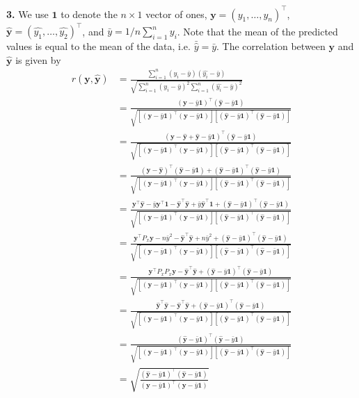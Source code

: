 \documentclass[12pt]{article}
\newcommand{\m}[1]{\mathbf{\bm{#1}}}
\begin{document}
\noindent \textbf{3.} We use $\m{1}$ to denote the $n\times 1$ vector of ones, $\m{y}=(y_1,\ldots,y_n)^\top$, $\hat{\m{y}}=(\hat{y_1},\ldots,\hat{y_2})^\top$, and $\bar{y}=1/n\sum_{i=1}^n y_i$. Note that the mean of the predicted values is equal to the mean of the data, i.e. $\bar{\hat{y}}=\bar{y}$. The correlation between $\m{y}$ and $\hat{\m{y}}$ is given by
\begin{align*}
r(\m{y}, \hat{\m{y}}) &= \frac{\sum_{i=1}^n(y_i-\bar{y})(\hat{y_i}-\bar{y})}{\sqrt{\sum_{i=1}^n(y_i-\bar{y})^2\sum_{i=1}^n(\hat{y_i}-\bar{y})^2}} \\
&= \frac{(\m{y}-\bar{y}\m{1})^\top(\hat{\m{y}}-\bar{y}\m{1})}{\sqrt{\left[(\m{y}-\bar{y}\m{1})^\top(\m{y}-\bar{y}\m{1})\right]\left[(\hat{\m{y}}-\bar{y}\m{1})^\top(\hat{\m{y}}-\bar{y}\m{1})\right]}} \\
&= \frac{(\m{y}-\hat{\m{y}}+\hat{\m{y}}-\bar{y}\m{1})^\top(\hat{\m{y}}-\bar{y}\m{1})}{\sqrt{\left[(\m{y}-\bar{y}\m{1})^\top(\m{y}-\bar{y}\m{1})\right]\left[(\hat{\m{y}}-\bar{y}\m{1})^\top(\hat{\m{y}}-\bar{y}\m{1})\right]}} \\
&= \frac{(\m{y}-\hat{\m{y}})^\top(\hat{\m{y}}-\bar{y}\m{1})+(\hat{\m{y}}-\bar{y}\m{1})^\top(\hat{\m{y}}-\bar{y}\m{1})}{\sqrt{\left[(\m{y}-\bar{y}\m{1})^\top(\m{y}-\bar{y}\m{1})\right]\left[(\hat{\m{y}}-\bar{y}\m{1})^\top(\hat{\m{y}}-\bar{y}\m{1})\right]}} \\
&= \frac{\m{y}^\top\hat{\m{y}}-\bar{y}\m{y}^\top\m{1}-\hat{\m{y}}^\top\hat{\m{y}}+\bar{y}\hat{\m{y}}^\top\m{1}+(\hat{\m{y}}-\bar{y}\m{1})^\top(\hat{\m{y}}-\bar{y}\m{1})}{\sqrt{\left[(\m{y}-\bar{y}\m{1})^\top(\m{y}-\bar{y}\m{1})\right]\left[(\hat{\m{y}}-\bar{y}\m{1})^\top(\hat{\m{y}}-\bar{y}\m{1})\right]}} \\
&= \frac{\m{y}^\top P_x\m{y}-n\bar{y}^2-\hat{\m{y}}^\top\hat{\m{y}}+n\bar{y}^2+(\hat{\m{y}}-\bar{y}\m{1})^\top(\hat{\m{y}}-\bar{y}\m{1})}{\sqrt{\left[(\m{y}-\bar{y}\m{1})^\top(\m{y}-\bar{y}\m{1})\right]\left[(\hat{\m{y}}-\bar{y}\m{1})^\top(\hat{\m{y}}-\bar{y}\m{1})\right]}} \\
&= \frac{\m{y}^\top P_xP_x\m{y}-\hat{\m{y}}^\top\hat{\m{y}}+(\hat{\m{y}}-\bar{y}\m{1})^\top(\hat{\m{y}}-\bar{y}\m{1})}{\sqrt{\left[(\m{y}-\bar{y}\m{1})^\top(\m{y}-\bar{y}\m{1})\right]\left[(\hat{\m{y}}-\bar{y}\m{1})^\top(\hat{\m{y}}-\bar{y}\m{1})\right]}} \\
&= \frac{\hat{\m{y}}^\top \hat{\m{y}}-\hat{\m{y}}^\top\hat{\m{y}}+(\hat{\m{y}}-\bar{y}\m{1})^\top(\hat{\m{y}}-\bar{y}\m{1})}{\sqrt{\left[(\m{y}-\bar{y}\m{1})^\top(\m{y}-\bar{y}\m{1})\right]\left[(\hat{\m{y}}-\bar{y}\m{1})^\top(\hat{\m{y}}-\bar{y}\m{1})\right]}} \\
&= \frac{(\hat{\m{y}}-\bar{y}\m{1})^\top(\hat{\m{y}}-\bar{y}\m{1})}{\sqrt{\left[(\m{y}-\bar{y}\m{1})^\top(\m{y}-\bar{y}\m{1})\right]\left[(\hat{\m{y}}-\bar{y}\m{1})^\top(\hat{\m{y}}-\bar{y}\m{1})\right]}} \\
&= \sqrt{\frac{(\hat{\m{y}}-\bar{y}\m{1})^\top(\hat{\m{y}}-\bar{y}\m{1})}{(\m{y}-\bar{y}\m{1})^\top(\m{y}-\bar{y}\m{1})}}
\end{align*}
\end{document}
